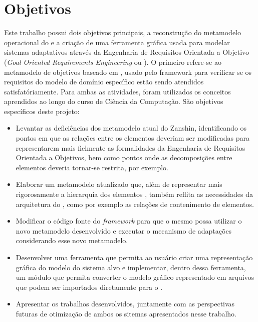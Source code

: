 \section{Objetivos}
\label{sec-intro-objetivos}

Este trabalho possui dois objetivos principais, a reconstrução do metamodelo operacional do \zanshin e a criação de uma ferramenta gráfica usada para modelar sistemas adaptativos através da Engenharia de Requisitos Orientada a Objetivo (\textit{Goal Oriented Requirements Engineering} ou \gore). O primeiro refere-se ao metamodelo de objetivos baseado em \istar, usado pelo framework para verificar se os requisitos do modelo de domínio específico estão sendo atendidos satisfatóriamente. Para ambas as atividades, foram utilizados os conceitos aprendidos ao longo do curso de Ciência da Computação. São objetivos específicos deste projeto:

\begin{itemize}
	
	\item Levantar as deficiências dos metamodelo atual do Zanshin, identificando os pontos em que as relações entre os elementos deveriam ser modificadas para representarem mais fielmente as formalidades da Engenharia de Requisitos Orientada a Objetivos, bem como pontos onde as decomposições entre elementos deveria tornar-se restrita, por exemplo. 
	
	\item Elaborar um metamodelo atualizado que, além de representar mais rigorosamente a hierarquia dos elementos \gore, também reflita as necessidades da arquitetura do \zanshin, como por exemplo as relações de contenimento de elementos.
	
	\item Modificar o código fonte do \textit{framework} para que o mesmo possa utilizar o novo metamodelo desenvolvido e executar o mecanismo de adaptações considerando esse novo metamodelo.
	
	\item Desenvolver uma ferramenta que permita ao usuário criar uma representação gráfica do modelo do sistema alvo e implementar, dentro dessa ferramenta, um módulo que permita converter o modelo gráfico representado em arquivos \xml que podem ser importados diretamente para o \zanshin.
	
	\item Apresentar os trabalhos desenvolvidos, juntamente com as perspectivas futuras de otimização de ambos os sitemas apresentados nesse trabalho.

\end{itemize}


